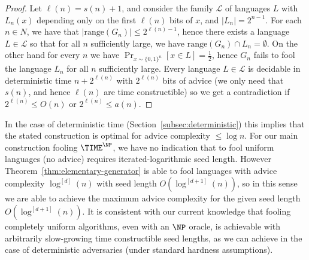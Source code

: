 \documentclass[11pt]{article}
\newcommand{\B}{\{0,1\}}
\begin{document}
\begin{proof}

Let $\ell(n)= s(n) + 1$, and consider the family $\mathcal{L}$ of languages $L$ with $L_n(x)$ depending only on the first $\ell(n)$ bits of $x$, and $|L_n| = 2^{n-1}$. 
For each $n \in N$, we have that $|\mathrm{range}(G_n)| \leq 2^{\ell(n)-1}$, hence there exists a language $L \in \mathcal{L}$ so that for all $n$ sufficiently large, we have $\mathrm{range}(G_n) \cap L_n = \emptyset$. On the other hand for every $n$ we have $\Pr_{x \sim \B^n}[x \in L] = \frac{1}{2}$, hence $G_n$ fails to fool the language $L_n$ for all $n$ sufficiently large. Every language $L \in \mathcal{L}$ is decidable in deterministic time $n + 2^{\ell(n)}$ with $2^{\ell(n)}$ bits of advice (we only need that $s(n)$, and hence $\ell(n)$ are time constructible) so we get a contradiction if $2^{\ell(n)} \leq O(n)$ or $2^{\ell(n)} \leq a(n)$.
\end{proof}

In the case of deterministic time (Section~\ref{subsec:deterministic}) this implies that the stated construction is optimal for advice complexity $\leq \log n$. For our main construction fooling $\TIME^{\NP}$, we have no indication that to fool uniform languages (no advice) requires iterated-logarithmic seed length. However Theorem~\ref{thm:elementary-generator} is able to fool languages with advice complexity $\log^{[d]}(n)$ with seed length $O(\log^{[d+1]}(n))$, so in this sense we are able to achieve the maximum advice complexity for the given seed length $O(\log^{[d+1]}(n))$. It is consistent with our current knowledge that fooling completely uniform algorithms, even with an $\NP$ oracle, is achievable with arbitrarily slow-growing time constructible seed lengths, as we can achieve in the case of deterministic adversaries (under standard hardness assumptions).
\end{document}
